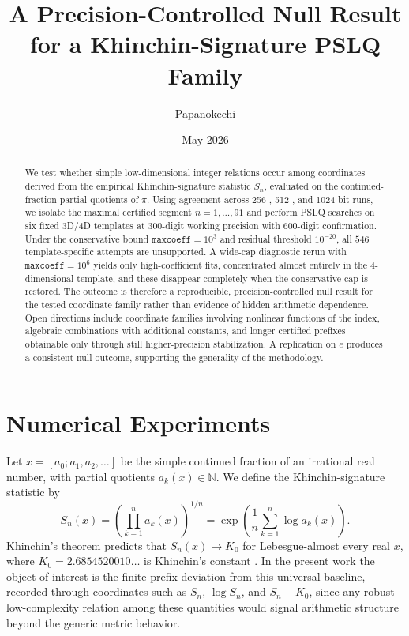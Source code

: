 \documentclass[11pt]{amsart}
\title{A Precision-Controlled Null Result for a Khinchin-Signature PSLQ Family}
\author{Papanokechi}
\date{May 2026}
\begin{document}
\begin{abstract}
We test whether simple low-dimensional integer relations occur among coordinates derived from the empirical Khinchin-signature statistic $S_n$, evaluated on the continued-fraction partial quotients of $\pi$. Using agreement across 256-, 512-, and 1024-bit runs, we isolate the maximal certified segment $n=1,\ldots,91$ and perform PSLQ searches on six fixed 3D/4D templates at 300-digit working precision with 600-digit confirmation. Under the conservative bound $\texttt{maxcoeff}=10^3$ and residual threshold $10^{-20}$, all $546$ template-specific attempts are unsupported. A wide-cap diagnostic rerun with $\texttt{maxcoeff}=10^6$ yields only high-coefficient fits, concentrated almost entirely in the 4-dimensional template, and these disappear completely when the conservative cap is restored. The outcome is therefore a reproducible, precision-controlled null result for the tested coordinate family rather than evidence of hidden arithmetic dependence. Open directions include coordinate families involving nonlinear functions of the index, algebraic combinations with additional constants, and longer certified prefixes obtainable only through still higher-precision stabilization. A replication on $e$ produces a consistent null outcome, supporting the generality of the methodology.
\end{abstract}

\maketitle

\section{Numerical Experiments}\label{sec:numerics}

Let $x=[a_0;a_1,a_2,\ldots]$ be the simple continued fraction of an irrational real number, with partial quotients $a_k(x)\in\mathbb{N}$. We define the Khinchin-signature statistic by
\[
S_n(x)=\left(\prod_{k=1}^n a_k(x)\right)^{1/n}=\exp\!\left(\frac{1}{n}\sum_{k=1}^n \log a_k(x)\right).
\]
Khinchin's theorem predicts that $S_n(x)\to K_0$ for Lebesgue-almost every real $x$, where $K_0=2.6854520010\ldots$ is Khinchin's constant \cite{BaileyBorweinCrandall1997,FlajoletVallee2000}. In the present work the object of interest is the finite-prefix deviation from this universal baseline, recorded through coordinates such as $S_n$, $\log S_n$, and $S_n-K_0$, since any robust low-complexity relation among these quantities would signal arithmetic structure beyond the generic metric behavior.
\end{document}
